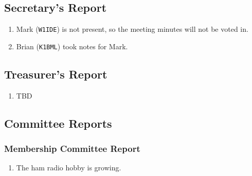 \documentclass[10pt,letterpaper]{article}
\begin{document}
\subsection{Secretary's Report}
\begin{enumerate}
  \item Mark (\texttt{W1IDE}) is not present, so the meeting minutes will not be voted in.
  \item Brian (\texttt{K1BML}) took notes for Mark.
\end{enumerate}

\newpage
\subsection{Treasurer's Report}
\begin{enumerate}
  \item TBD
\end{enumerate}


\subsection{Committee Reports}

\subsubsection{Membership Committee Report}
\begin{enumerate}
  \item The ham radio hobby is growing.
\end{enumerate}
\end{document}
